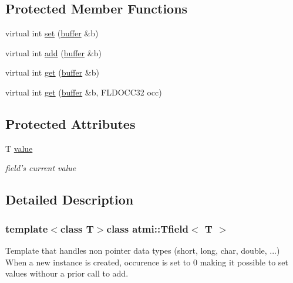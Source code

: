 \subsection*{Protected Member Functions}
\begin{DoxyCompactItemize}
\item 
virtual int \hyperlink{classatmi_1_1_tfield_a7bd1997e976116990ad0e2072320db77}{set} (\hyperlink{classatmi_1_1buffer}{buffer} \&b)
\item 
virtual int \hyperlink{classatmi_1_1_tfield_a4962b3aa080aba4ecffc7f3fa98be2da}{add} (\hyperlink{classatmi_1_1buffer}{buffer} \&b)
\item 
virtual int \hyperlink{classatmi_1_1_tfield_aa70ce8893913c8f3d968cae72f2cdd11}{get} (\hyperlink{classatmi_1_1buffer}{buffer} \&b)
\item 
virtual int \hyperlink{classatmi_1_1_tfield_ae8de2dd360d04fc2465e4169b239c222}{get} (\hyperlink{classatmi_1_1buffer}{buffer} \&b, F\+L\+D\+O\+C\+C32 occ)
\end{DoxyCompactItemize}
\subsection*{Protected Attributes}
\begin{DoxyCompactItemize}
\item 
\hypertarget{classatmi_1_1_tfield_a89852f63b07d2f6d27d9866b030d1c5d}{T \hyperlink{classatmi_1_1_tfield_a89852f63b07d2f6d27d9866b030d1c5d}{value}}\label{classatmi_1_1_tfield_a89852f63b07d2f6d27d9866b030d1c5d}

\begin{DoxyCompactList}\small\item\em field's current value \end{DoxyCompactList}\end{DoxyCompactItemize}


\subsection{Detailed Description}
\subsubsection*{template$<$class T$>$class atmi\+::\+Tfield$<$ T $>$}



Template that handles non pointer data types (short, long, char, double, ...) When a new instance is created, occurence is set to 0 making it possible to set values withour a prior call to add. 

